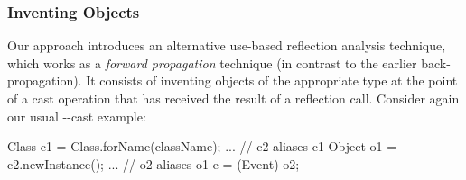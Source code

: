 

%
%

\subsubsection{Inventing Objects}
\label{reflection/sec:invention}

Our approach introduces an alternative use-based reflection analysis
technique, which works as a \emph{forward propagation} technique (in
contrast to the earlier back-propagation). It consists of inventing
objects of the appropriate type at the point of a cast operation that
has received the result of a reflection call. Consider again our
usual --cast example:

\begin{javacodelinum}
Class c1 = Class.forName(className);
...      // c2 aliases c1
Object o1 = c2.newInstance(); 
...      // o2 aliases o1
e = (Event) o2; 
\end{javacodelinum}

